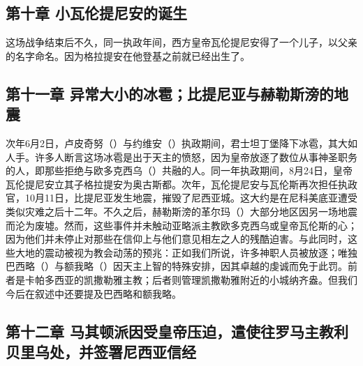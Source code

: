 
\subsection{第十章 小瓦伦提尼安的诞生}

这场战争结束后不久，同一执政年间，西方皇帝瓦伦提尼安得了一个儿子，以父亲的名字命名。因为格拉提安在他登基之前就已经出生了。\par


\subsection{第十一章 异常大小的冰雹；比提尼亚与赫勒斯滂的地震}

次年6月2日，卢皮奇努（）与约维安（）执政期间，君士坦丁堡降下冰雹，其大如人手。许多人断言这场冰雹是出于天主的愤怒，因为皇帝放逐了数位从事神圣职务的人，即那些拒绝与欧多克西乌（）共融的人。同一年执政期间，8月24日，皇帝瓦伦提尼安立其子格拉提安为奥古斯都。次年，瓦伦提尼安与瓦伦斯再次担任执政官，10月11日，比提尼亚发生地震，摧毁了尼西亚城。这大约是在尼科美底亚遭受类似灾难之后十二年。不久之后，赫勒斯滂的革尔玛（）大部分地区因另一场地震而沦为废墟。然而，这些事件并未触动亚略派主教欧多克西乌或皇帝瓦伦斯的心；因为他们并未停止对那些在信仰上与他们意见相左之人的残酷迫害。与此同时，这些大地的震动被视为教会动荡的预兆：正如我们所说，许多神职人员被放逐；唯独巴西略（）与额我略（）因天主上智的特殊安排，因其卓越的虔诚而免于此罚。前者是卡帕多西亚的凯撒勒雅主教；后者则管理凯撒勒雅附近的小城纳齐盎。但我们今后在叙述中还要提及巴西略和额我略。\par


\subsection{第十二章 马其顿派因受皇帝压迫，遣使往罗马主教利贝里乌处，并签署尼西亚信经}

